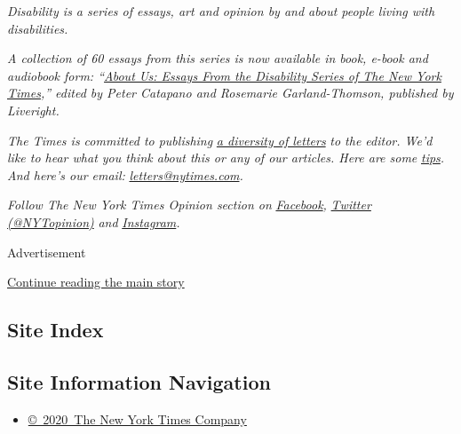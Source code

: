 \emph{Disability is a series of essays, art and opinion by and about
people living with disabilities.}

\emph{A collection of 60 essays from this series is now available in
book, e-book and audiobook form:
``}\href{https://www.aboutusbook.com/}{\emph{About Us: Essays From the
Disability Series of The New York Times}}\emph{,'' edited by Peter
Catapano and Rosemarie Garland-Thomson, published by Liveright.}

\emph{The Times is committed to publishing}
\href{https://www.nytimes.com/2019/01/31/opinion/letters/letters-to-editor-new-york-times-women.html}{\emph{a
diversity of letters}} \emph{to the editor. We'd like to hear what you
think about this or any of our articles. Here are some}
\href{https://help.nytimes.com/hc/en-us/articles/115014925288-How-to-submit-a-letter-to-the-editor}{\emph{tips}}\emph{.
And here's our email:}
\href{mailto:letters@nytimes.com}{\emph{letters@nytimes.com}}\emph{.}

\emph{Follow The New York Times Opinion section on}
\href{https://www.facebook.com/nytopinion}{\emph{Facebook}}\emph{,}
\href{http://twitter.com/NYTOpinion}{\emph{Twitter (@NYTopinion)}}
\emph{and}
\href{https://www.instagram.com/nytopinion/}{\emph{Instagram}}\emph{.}

Advertisement

\protect\hyperlink{after-bottom}{Continue reading the main story}

\hypertarget{site-index}{%
\subsection{Site Index}\label{site-index}}

\hypertarget{site-information-navigation}{%
\subsection{Site Information
Navigation}\label{site-information-navigation}}

\begin{itemize}
\tightlist
\item
  \href{https://help.nytimes.com/hc/en-us/articles/115014792127-Copyright-notice}{©~2020~The
  New York Times Company}
\end{itemize}

